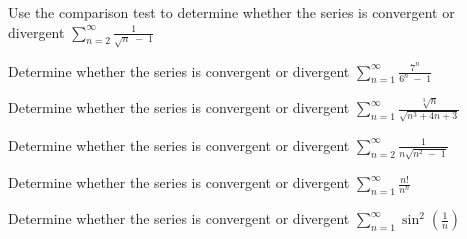 \documentclass[
  course = {{MATH102 Calculus II}},
  quartile = {{2}},
  assignment = {{Sections 11.4}},%
  topic = {{The Comparison Tests}},
  firstexercise = 1,
  term = 203
]{../class/aga-homework}
\begin{document}
\newpage

\problem Use the comparison test to determine whether the series is convergent or divergent
$\displaystyle \sum_{n=2}^{\infty}\frac{1}{\sqrt{n}\;-\;1}$

\newpage

\problem Determine whether the series is convergent or divergent
$\displaystyle \sum_{n=1}^{\infty}\frac{7^n}{6^n\;-\;1}$

\newpage

\problem Determine whether the series is convergent or divergent
$\displaystyle \sum_{n=1}^{\infty}\frac{\sqrt[3]{n}}{\sqrt{n^3+4n+3}}$

\newpage

\problem Determine whether the series is convergent or divergent
$\displaystyle \sum_{n=2}^{\infty}\frac{1}{n\sqrt{n^2\;-\;1}}$

\newpage

\problem Determine whether the series is convergent or divergent
$\displaystyle \sum_{n=1}^{\infty}\frac{n!}{n^n}$

\newpage

\problem Determine whether the series is convergent or divergent
$\displaystyle \sum_{n=1}^{\infty}\sin^2\left(\frac{1}{n}\right)$

\newpage
\afterpage{\null\newpage}

\afterpage{\null\newpage}

\afterpage{\null\newpage}
\end{document}
